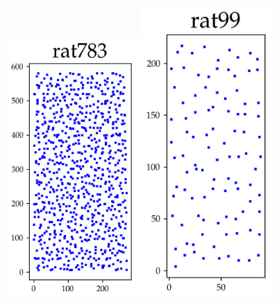\begin{appendices}
\begin{figure}[H]
\includegraphics[width=5cm]{../tsplib_euc2d_pictures_of_instances/rat783.png}
\includegraphics[width=5cm]{../tsplib_euc2d_pictures_of_instances/rat99.png}

\end{figure}


\end{appendices}
